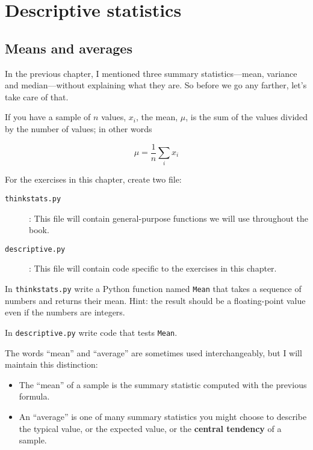 \documentclass[10pt]{book}
\begin{document}
\chapter{Descriptive statistics}

\section{Means and averages}
\label{mean}

In the previous chapter, I mentioned three summary statistics---mean,
variance and median---without explaining what they are.  So before
we go any farther, let's take care of that.

If you have a sample of $n$ values, $x_i$, the mean, $\mu$, is
the sum of the values divided by the number of values; in other words

\[ \mu = \frac{1}{n} \sum_i x_i \]

\begin{ex}
For the exercises in this chapter, create two file:

\begin{description}

\item[{\tt thinkstats.py}]: This file will contain general-purpose
functions we will use throughout the book.

\item[{\tt descriptive.py}]: This file will contain code specific
to the exercises in this chapter.

\end{description}

In {\tt thinkstats.py} write a Python function named {\tt Mean} that
takes a sequence of numbers and returns their mean.  Hint: the result
should be a floating-point value even if the numbers are integers.

In {\tt descriptive.py} write code that tests {\tt Mean}.
\end{ex}

The words ``mean'' and ``average'' are sometimes used interchangeably,
but I will maintain this distinction:

\begin{itemize}

\item The ``mean'' of a sample is the summary statistic computed with
  the previous formula.

\item An ``average'' is one of many summary statistics you might
  choose to describe the typical value, or the expected value, or the
  {\bf central tendency} of a sample.  

\end{itemize}
\end{document}
